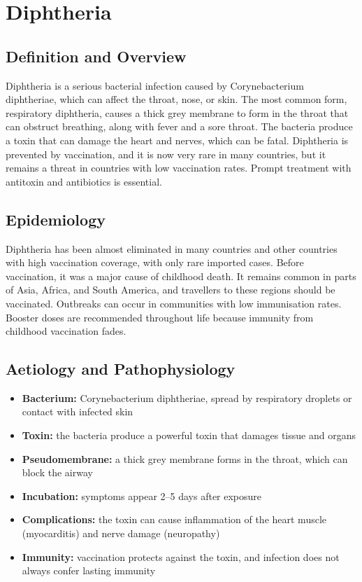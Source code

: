 \chapter{Diphtheria}

\section*{Definition and Overview}
Diphtheria is a serious bacterial infection caused by Corynebacterium diphtheriae, which can affect the throat, nose, or skin. The most common form, respiratory diphtheria, causes a thick grey membrane to form in the throat that can obstruct breathing, along with fever and a sore throat. The bacteria produce a toxin that can damage the heart and nerves, which can be fatal. Diphtheria is prevented by vaccination, and it is now very rare in many countries, but it remains a threat in countries with low vaccination rates. Prompt treatment with antitoxin and antibiotics is essential.

\section*{Epidemiology}
Diphtheria has been almost eliminated in many countries and other countries with high vaccination coverage, with only rare imported cases. Before vaccination, it was a major cause of childhood death. It remains common in parts of Asia, Africa, and South America, and travellers to these regions should be vaccinated. Outbreaks can occur in communities with low immunisation rates. Booster doses are recommended throughout life because immunity from childhood vaccination fades.

\section*{Aetiology and Pathophysiology}
\begin{itemize}
    \item \textbf{Bacterium:} Corynebacterium diphtheriae, spread by respiratory droplets or contact with infected skin
    \item \textbf{Toxin:} the bacteria produce a powerful toxin that damages tissue and organs
    \item \textbf{Pseudomembrane:} a thick grey membrane forms in the throat, which can block the airway
    \item \textbf{Incubation:} symptoms appear 2--5 days after exposure
    \item \textbf{Complications:} the toxin can cause inflammation of the heart muscle (myocarditis) and nerve damage (neuropathy)
    \item \textbf{Immunity:} vaccination protects against the toxin, and infection does not always confer lasting immunity
\end{itemize}

